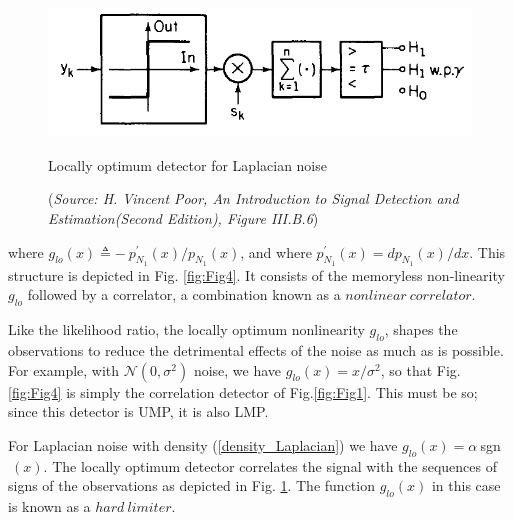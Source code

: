 \documentclass[a4paper,english,12pt]{article}
\begin{document}
\begin{exmp}
\begin{figure}[h]
\centering
\captionsetup{justification=centering}
\includegraphics[width=0.8\linewidth]{Figures/lec10Fig5}
\caption{Locally optimum detector for Laplacian noise}
\caption*{\footnotesize(\textit{Source: H. Vincent Poor, An Introduction to Signal Detection and Estimation(Second Edition), Figure	 III.B.6})}
\label{fig:Fig5}
\end{figure}
where $g_{lo}(x)\triangleq-\ p_{N_{1}}^\prime(x)/p_{N_{1}}(x)$, and where $p_{N_{1}}^\prime(x)=dp_{N_{1}}(x)/dx$. This structure is depicted in  Fig. \ref{fig:Fig4}. It consists of the memoryless non-linearity $g_{lo}$ followed by a correlator, a combination known as a $nonlinear\ correlator$.
\par Like the likelihood ratio, the locally optimum nonlinearity $g_{lo}$, shapes the observations to reduce the detrimental effects of the noise as much as is possible. For example, with $\mathcal{N}(0,\sigma^2)$ noise, we have $g_{lo}(x)=x/\sigma^2$, so that  Fig. \ref{fig:Fig4} is simply the correlation detector of Fig.\ref{fig:Fig1}. This must be so; since this detector is UMP, it is also LMP.
\par For Laplacian noise with density (\ref{density_Laplacian}) we have $g_{lo}(x)=\alpha\ $sgn$\ (x)$. The locally optimum detector correlates the signal with the sequences of signs of the observations as depicted in Fig. \ref{fig:Fig5}. The function $g_{lo}(x)$ in this case is known as a $hard\ limiter$.
\end{exmp}
\end{document}
